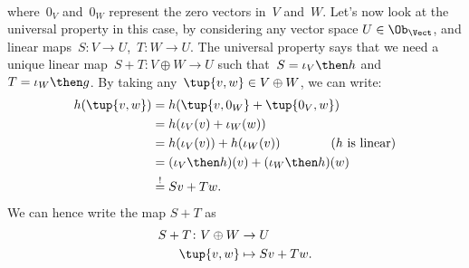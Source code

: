 {\begin{example}
\begin{equation*}
\begin{aligned}
            \end{aligned}
        \end{equation*}
        where~$0_V$ and~$0_W$ represent the zero vectors in~$V$ and~$W$. Let's now look at the universal property in this case, by considering any vector space $U\in \Ob_\Vect$, and linear maps~$S\colon V\to U$,~$T\colon W\to U$. The universal property says that we need a unique linear map~$S+T\colon V\oplus W \to U$ such that~$S=\iota_V\then h$ and~$T=\iota_W\then g$. By taking any~$\tup{v,w}\in V\oplus W$, we can write:
        \begin{equation*}
            \begin{aligned}
                h(\tup{v,w})&=h(\tup{v,0_W}+\tup{0_V,w})\\
                &=h(\iota_V(v)+\iota_W(w)) \\
                &=h(\iota_V(v))+h(\iota_W(v)) \qquad \qquad (h \text{ is linear})\\
                &=(\iota_V\then h)(v)+(\iota_W\then h)(w)\\
                &\overset{!}{=}Sv+Tw.
            \end{aligned}
        \end{equation*}
        We can hence write the map $S+T$ as
        \begin{equation*}
            \begin{aligned}
                S+T\colon V\oplus W&\to U\\
                \tup{v,w}&\mapsto Sv+Tw.
            \end{aligned}
        \end{equation*}
    \end{example}
}
